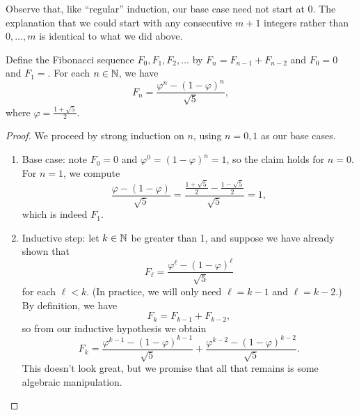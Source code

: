 \documentclass[../notes.tex]{subfiles}
\begin{document}
Observe that, like ``regular'' induction, our base case need not start at $0$. The explanation that we could start with any consecutive $m + 1$ integers rather than $0, \dots, m$ is identical to what we did above.
\begin{example}
    Define the Fibonacci sequence $F_0,F_1,F_2,\ldots$ by $F_n=F_{n-1}+F_{n-2}$ and $F_0=0$ and $F_1=$. For each $n \in \mathbb N$, we have
    \[F_n = \frac{\varphi^n - (1 - \varphi)^n}{\sqrt{5}},\]
    where $\varphi = \frac{1 + \sqrt{5}}{2}$.
\end{example}
\begin{proof}
    We proceed by strong induction on $n$, using $n = 0, 1$ as our base cases.
    \begin{enumerate}
        \item Base case: note $F_0=0$ and $\varphi^0 = (1 - \varphi)^n = 1$, so the claim holds for $n=0$. For $n=1$, we compute
        \[\frac{\varphi-(1-\varphi)}{\sqrt5}=\frac{\frac{1+\sqrt5}2-\frac{1-\sqrt5}2}{\sqrt5}=1,\]
        which is indeed $F_1$.
        \item Inductive step: let $k \in \mathbb N$ be greater than 1, and suppose we have already shown that
        \[F_\ell = \frac{\varphi^\ell - ( 1 - \varphi)^\ell}{\sqrt{5}}\]
        for each $\ell < k$. (In practice, we will only need $\ell=k-1$ and $\ell=k-2$.) By definition, we have
        \[F_k = F_{k - 1} + F_{k - 2},\]
        so from our inductive hypothesis we obtain
        \begin{equation}
            F_k = \frac{\varphi^{k - 1} - (1 - \varphi)^{k - 1}}{\sqrt{5}} + \frac{\varphi^{k - 2} - (1 - \varphi)^{k - 2}}{\sqrt{5}}. \label{eq:almost-done-fib}
        \end{equation}
        This doesn't look great, but we promise that all that remains is some algebraic manipulation.
        

\end{enumerate}
\end{proof}
\end{document}
